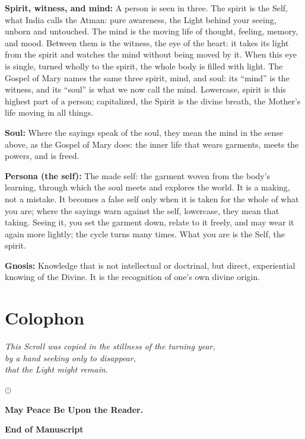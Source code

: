 \documentclass[10pt, openright]{book}
\begin{document}
\textbf{Spirit, witness, and mind:} A person is seen in three. The
spirit is the Self, what India calls the Atman: pure awareness, the
Light behind your seeing, unborn and untouched. The mind is the moving
life of thought, feeling, memory, and mood. Between them is the witness,
the eye of the heart: it takes its light from the spirit and watches the
mind without being moved by it. When this eye is single, turned wholly
to the spirit, the whole body is filled with light. The Gospel of Mary
names the same three spirit, mind, and soul: its ``mind'' is the
witness, and its ``soul'' is what we now call the mind. Lowercase,
spirit is this highest part of a person; capitalized, the Spirit is the
divine breath, the Mother's life moving in all things.

\textbf{Soul:} Where the sayings speak of the soul, they mean the mind
in the sense above, as the Gospel of Mary does: the inner life that
wears garments, meets the powers, and is freed.

\textbf{Persona (the self):} The made self: the garment woven from the
body's learning, through which the soul meets and explores the world. It
is a making, not a mistake. It becomes a false self only when it is
taken for the whole of what you are; where the sayings warn against the
self, lowercase, they mean that taking. Seeing it, you set the garment
down, relate to it freely, and may wear it again more lightly; the cycle
turns many times. What you are is the Self, the spirit.

\textbf{Gnosis:} Knowledge that is not intellectual or doctrinal, but
direct, experiential knowing of the Divine. It is the recognition of
one's own divine origin.

\chapter{Colophon}\label{colophon}

\begin{center}
\emph{This Scroll was copied in the stillness of the turning year,\\
by a hand seeking only to disappear,\\
that the Light might remain.}

\(\odot\)

\textbf{May Peace Be Upon the Reader.}
\end{center}

\begin{center}
\textbf{End of Manuscript}
\end{center}
\end{document}
